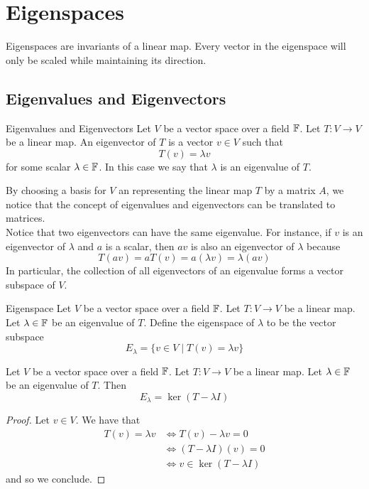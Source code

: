 \documentclass[a4paper]{article}
\begin{document}
\pagebreak
\section{Eigenspaces}
Eigenspaces are invariants of a linear map. Every vector in the eigenspace will only be scaled while maintaining its direction. 

\subsection{Eigenvalues and Eigenvectors}
\begin{defn}{Eigenvalues and Eigenvectors}{} Let $V$ be a vector space over a field $\mathbb{F}$. Let $T:V\to V$ be a linear map. An eigenvector of $T$ is a vector $v\in  V$ such that $$T(v)=\lambda v$$ for some scalar $\lambda\in\mathbb{F}$. In this case we say that $\lambda$ is an eigenvalue of $T$. 
\end{defn}

By choosing a basis for $V$ an representing the linear map $T$ by a matrix $A$, we notice that the concept of eigenvalues and eigenvectors can be translated to matrices. \\

Notice that two eigenvectors can have the same eigenvalue. For instance, if $v$ is an eigenvector of $\lambda$ and $a$ is a scalar, then $av$ is also an eigenvector of $\lambda$ because $$T(av)=aT(v)=a(\lambda v)=\lambda(av)$$ In particular, the collection of all eigenvectors of an eigenvalue forms a vector subspace of $V$. 

\begin{defn}{Eigenspace}{} Let $V$ be a vector space over a field $\mathbb{F}$. Let $T:V\to V$ be a linear map. Let $\lambda\in\mathbb{F}$ be an eigenvalue of $T$. Define the eigenspace of $\lambda$ to be the vector subspace $$E_\lambda=\{v\in V\;|\;T(v)=\lambda v\}$$
\end{defn}

\begin{lmm}{}{} Let $V$ be a vector space over a field $\mathbb{F}$. Let $T:V\to V$ be a linear map. Let $\lambda\in\mathbb{F}$ be an eigenvalue of $T$. Then $$E_\lambda=\ker(T-\lambda I)$$ 
\begin{proof}
Let $v\in V$. We have that 
\begin{align*}
T(v)=\lambda v&\iff T(v)-\lambda v=0\\
&\iff (T-\lambda I)(v)=0\\
&\iff v\in\ker(T-\lambda I)
\end{align*}
and so we conclude. 
\end{proof}
\end{lmm}
\end{document}
